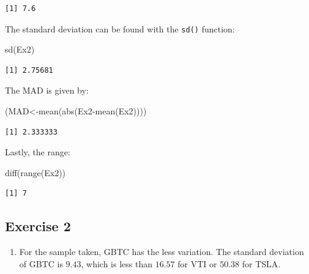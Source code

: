 \documentclass[
  letterpaper,
  DIV=11,
  numbers=noendperiod]{scrreprt}
\newenvironment{Shaded}{\begin{snugshade}}{\end{snugshade}}
\newcommand{\FunctionTok}[1]{\textcolor[rgb]{0.28,0.35,0.67}{#1}}
\newcommand{\NormalTok}[1]{\textcolor[rgb]{0.00,0.23,0.31}{#1}}
\newcommand{\OtherTok}[1]{\textcolor[rgb]{0.00,0.23,0.31}{#1}}
\newcommand{\SpecialCharTok}[1]{\textcolor[rgb]{0.37,0.37,0.37}{#1}}
\providecommand{\tightlist}{%
  \setlength{\itemsep}{0pt}\setlength{\parskip}{0pt}}\usepackage{longtable,booktabs,array}
\begin{document}
\begin{verbatim}
[1] 7.6
\end{verbatim}

The standard deviation can be found with the \texttt{sd()} function:

\begin{Shaded}
\begin{Highlighting}[numbers=left,,]
\FunctionTok{sd}\NormalTok{(Ex2)}
\end{Highlighting}
\end{Shaded}

\begin{verbatim}
[1] 2.75681
\end{verbatim}

The MAD is given by:

\begin{Shaded}
\begin{Highlighting}[numbers=left,,]
\NormalTok{(MAD}\OtherTok{\textless{}{-}}\FunctionTok{mean}\NormalTok{(}\FunctionTok{abs}\NormalTok{(Ex2}\SpecialCharTok{{-}}\FunctionTok{mean}\NormalTok{(Ex2))))}
\end{Highlighting}
\end{Shaded}

\begin{verbatim}
[1] 2.333333
\end{verbatim}

Lastly, the range:

\begin{Shaded}
\begin{Highlighting}[numbers=left,,]
\FunctionTok{diff}\NormalTok{(}\FunctionTok{range}\NormalTok{(Ex2))}
\end{Highlighting}
\end{Shaded}

\begin{verbatim}
[1] 7
\end{verbatim}

\hypertarget{exercise-2-7}{%
\subsection*{Exercise 2}\label{exercise-2-7}}

\begin{blackbox}

\begin{enumerate}
\def\labelenumi{\arabic{enumi}.}
\tightlist
\item
  For the sample taken, GBTC has the less variation. The standard
  deviation of GBTC is \(9.43\), which is less than \(16.57\) for VTI or
  \(50.38\) for TSLA.
\end{enumerate}

\end{blackbox}
\end{document}
